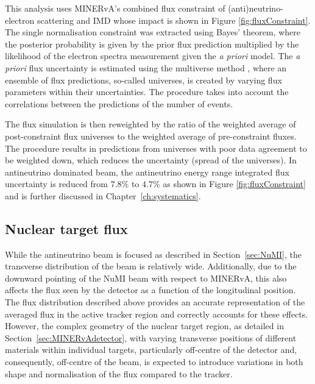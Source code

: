This analysis uses MINERvA's combined flux constraint of (anti)neutrino-electron scattering and IMD \cite{Zazueta2023_PhysRevD.107.012001} whose impact is shown in Figure \ref*{fig:fluxConstraint}. The single normalisation constraint was extracted using Bayes' theorem, where the posterior probability is given by the prior flux prediction multiplied by the likelihood of the electron spectra measurement given the \textit{a priori} model. The \textit{a priori} flux uncertainty is estimated using the multiverse method \cite{MAT_Messerly_2021}, where an ensemble of flux predictions, so-called universes, is created by varying flux parameters within their uncertainties. The procedure takes into account the correlations between the predictions of the number of events. 

The flux simulation is then reweighted by the ratio of the weighted average of post-constraint flux universes to the weighted average of pre-constraint fluxes. The procedure results in predictions from universes with poor data agreement to be weighted down, which reduces the uncertainty (spread of the universes). In antineutrino dominated beam, the antineutrino energy range integrated flux uncertainty is reduced from $7.8\%$ to $4.7\%$ \cite{Zazueta2023_PhysRevD.107.012001} as shown in Figure \ref*{fig:fluxConstraint} and is further discussed in Chapter~\ref{ch:systematics}.

\subsection{Nuclear target flux} \label{sec:nuclear_target_flux}


While the antineutrino beam is focused as described in Section~\ref{sec:NuMI}, the transverse distribution of the beam is relatively wide. Additionally, due to the downward pointing of the NuMI beam with respect to MINERvA, this also affects the flux seen by the detector as a function of the longitudinal position.\enlargethispage{1\baselineskip} The flux distribution described above provides an accurate representation of the averaged flux in the active tracker region and correctly accounts for these effects. However, the complex geometry of the nuclear target region, as detailed in Section~\ref{sec:MINERvAdetector}, with varying transverse positions of different materials within individual targets, particularly off-centre of the detector and, consequently, off-centre of the beam, is expected to introduce variations in both shape and normalisation of the flux compared to the tracker.

